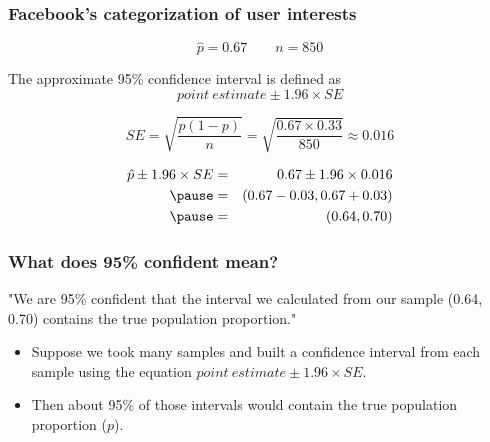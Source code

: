 \documentclass[t,compress,mathserif]{beamer}
\begin{document}
\begin{frame}
\frametitle{Facebook's categorization of user interests}

\[ \hat{p} = 0.67 \qquad n = 850 \]


The approximate 95\% confidence interval is defined as 
\[ point~estimate \pm 1.96 \times SE \]


\vspace{-0.3cm}
\[ SE = \sqrt{\frac{p(1-p)}{n}} = \sqrt{\frac{0.67 \times 0.33}{850}} \approx 0.016 \]


\vspace{-0.3cm}
\begin{eqnarray*}
\hat{p} \pm 1.96 \times SE &=& 0.67 \pm 1.96 \times 0.016 \\
\pause
&=& (0.67 - 0.03, 0.67 + 0.03) \\
\pause
&=& (0.64, 0.70)
\end{eqnarray*}

\vspace{-3em}

\end{frame}


\begin{frame}
\frametitle{What does 95\% confident mean?}

"We are 95\% confident that the interval we calculated from our sample (0.64, 0.70) contains the true population proportion."
\pause
\begin{itemize}

\item Suppose we took many samples and built a confidence interval from each sample using the equation $point~estimate \pm 1.96 \times SE$.

\item Then about 95\% of those intervals would contain the true population proportion ($p$). 

\end{itemize}

\end{frame}

\end{document}

